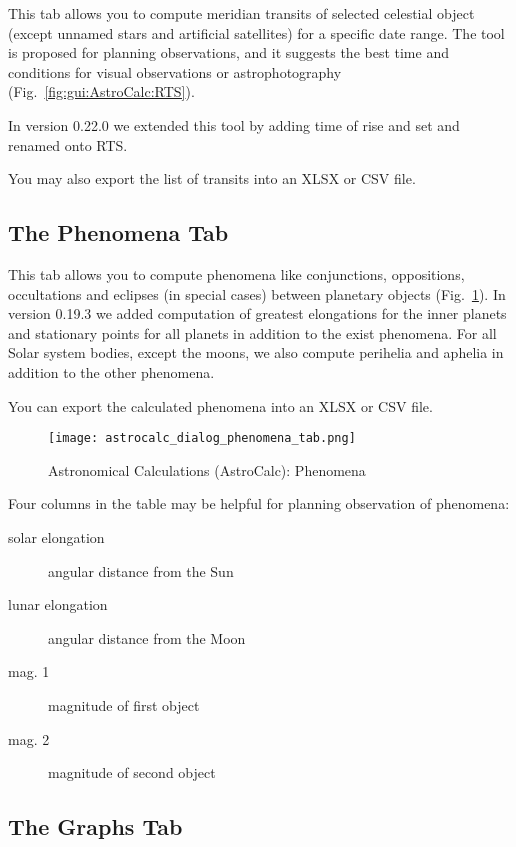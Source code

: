 \noindent This  tab allows you to compute meridian transits of selected celestial object 
(except unnamed stars and artificial satellites) for a specific date range. 
The tool is proposed for planning observations, and it suggests the best time and conditions 
for visual observations or astrophotography (Fig.~\ref{fig:gui:AstroCalc:RTS}). 

In version 0.22.0 we extended this tool by adding time of rise and set and renamed onto RTS.

You may also export the list of transits into an XLSX or CSV file.

\subsection{The Phenomena Tab}
\label{sec:gui:AstroCalc:Phenomena}

This tab allows you to compute phenomena like conjunctions, oppositions, 
occultations and eclipses (in special cases) between planetary objects 
(Fig.~\ref{fig:gui:AstroCalc:Phenomena}). 
In version 0.19.3 we added computation of greatest 
elongations for the inner planets and stationary points for all planets in
addition to the exist phenomena. For all Solar system bodies, except the moons, 
we also compute perihelia and aphelia in addition to the other phenomena.

You can export the calculated phenomena into an XLSX or CSV file.

\begin{figure}[tbp]
\centering\texttt{[image: astrocalc\_dialog\_phenomena\_tab.png]}
\caption{Astronomical Calculations (AstroCalc): Phenomena}
\label{fig:gui:AstroCalc:Phenomena}
\end{figure}

Four columns in the table may be helpful for planning observation of phenomena:
\begin{description}
  \item[solar elongation] angular distance from the Sun
  \item[lunar elongation] angular distance from the Moon
  \item[mag. 1] magnitude of first object
  \item[mag. 2] magnitude of second object
\end{description}


\subsection{The Graphs Tab}
\label{sec:gui:AstroCalc:Graphs}

